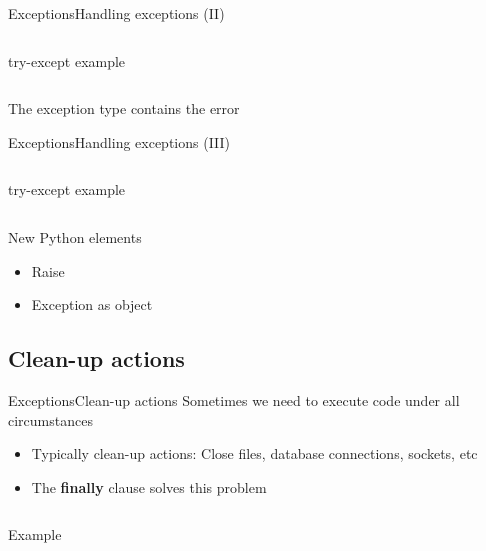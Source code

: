 \documentclass[10pt,compress]{beamer} %
\begin{document}
\begin{frame}{Exceptions}{Handling exceptions (II)}
    \begin{columns}
	\begin{exampleblock}{try-except example}
	\vspace{-0.2cm}
		
	\vspace{-0.2cm}
	\end{exampleblock}
	\end{columns}
	\bigskip
	The exception type contains the error
\end{frame}

\begin{frame}{Exceptions}{Handling exceptions (III)}
	\vspace{-0.2cm}
    \begin{columns}
	\begin{exampleblock}{try-except example}
	\vspace{-0.2cm}
		
	\vspace{-0.2cm}
	\end{exampleblock}
	\end{columns}
	\bigskip
	New Python elements
		\begin{itemize}
		\item Raise
        \item Exception as object
		\end{itemize}
\end{frame}

\subsection{Clean-up actions}
\begin{frame}{Exceptions}{Clean-up actions}
	\vspace{-0.2cm}
	Sometimes we need to execute code under all circumstances
	\begin{itemize}
		\item Typically clean-up actions: Close files, database connections, sockets, etc
		\item The \textbf{finally} clause solves this problem
	\end{itemize}

	\vspace{-0.2cm}
    \begin{columns}
	\begin{exampleblock}{Example}
	\vspace{-0.2cm}
		
	\vspace{-0.2cm}
	\end{exampleblock}

	\end{columns}
\end{frame}
\end{document}
